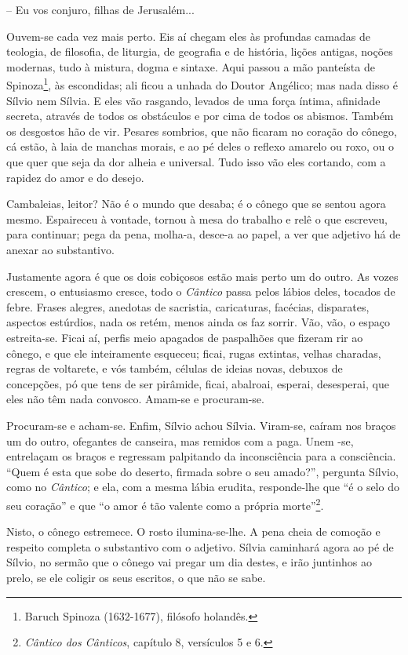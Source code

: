 -- Eu vos conjuro, filhas de Jerusalém...

Ouvem-se cada vez mais perto. Eis aí chegam eles às profundas camadas de
teologia, de filosofia, de liturgia, de geografia e de história, lições
antigas, noções modernas, tudo à mistura, dogma e sintaxe. Aqui passou a
mão panteísta de Spinoza\footnote{Baruch Spinoza (1632-1677), filósofo
  holandês.}, às escondidas; ali ficou a unhada do Doutor Angélico; mas
nada disso é Sílvio nem Sílvia. E eles vão rasgando, levados de uma
força íntima, afinidade secreta, através de todos os obstáculos e por
cima de todos os abismos. Também os desgostos hão de vir. Pesares
sombrios, que não ficaram no coração do cônego, cá estão, à laia de
manchas morais, e ao pé deles o reflexo amarelo ou roxo, ou o que quer
que seja da dor alheia e universal. Tudo isso vão eles cortando, com a
rapidez do amor e do desejo.

Cambaleias, leitor? Não é o mundo que desaba; é o cônego que se sentou
agora mesmo. Espaireceu à vontade, tornou à mesa do trabalho e relê o
que escreveu, para continuar; pega da pena, molha-a, desce-a ao papel, a
ver que adjetivo há de anexar ao substantivo.

Justamente agora é que os dois cobiçosos estão mais perto um do outro.
As vozes crescem, o entusiasmo cresce, todo o \emph{Cântico} passa pelos
lábios deles, tocados de febre. Frases alegres, anedotas de sacristia,
caricaturas, facécias, disparates, aspectos estúrdios, nada os retém,
menos ainda os faz sorrir. Vão, vão, o espaço estreita-se. Ficai aí,
perfis meio apagados de paspalhões que fizeram rir ao cônego, e que ele
inteiramente esqueceu; ficai, rugas extintas, velhas charadas, regras de
voltarete, e vós também, células de ideias novas, debuxos de concepções,
pó que tens de ser pirâmide, ficai, abalroai, esperai, desesperai, que
eles não têm nada convosco. Amam-se e procuram-se.

Procuram-se e acham-se. Enfim, Sílvio achou Sílvia. Viram-se, caíram nos
braços um do outro, ofegantes de canseira, mas remidos com a paga. Unem
-se, entrelaçam os braços e regressam palpitando da inconsciência para a
consciência. ``Quem é esta que sobe do deserto, firmada sobre o seu
amado?'', pergunta Sílvio, como no \emph{Cântico}; e ela, com a mesma
lábia erudita, responde-lhe que ``é o selo do seu coração'' e que ``o
amor é tão valente como a própria morte''\footnote{\emph{Cântico dos
  Cânticos}, capítulo 8, versículos 5 e 6.}.

Nisto, o cônego estremece. O rosto ilumina-se-lhe. A pena cheia de
comoção e respeito completa o substantivo com o adjetivo. Sílvia
caminhará agora ao pé de Sílvio, no sermão que o cônego vai pregar um
dia destes, e irão juntinhos ao prelo, se ele coligir os seus escritos,
o que não se sabe.

